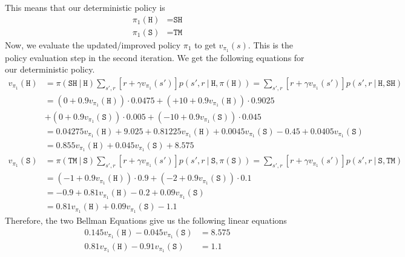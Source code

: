 \documentclass[11pt]{article}
\begin{document}
    This means that our deterministic policy is
    \begin{align*}
        \pi_{1}(\texttt{H}) &= \texttt{SH} \\
        \pi_{1}(\texttt{S}) &= \texttt{TM}
    \end{align*}
    Now, we evaluate the updated/improved policy $\pi_{1}$ to get $v_{\pi_{1}}(s)$. This is the policy evaluation step in the second
    iteration. We get the following equations for our deterministic policy.
    \begin{align*}
        v_{\pi_{1}}(\texttt{H}) &= \pi(\texttt{SH} \ | \ \texttt{H}) \sum_{s', r} \left[ r + \gamma v_{\pi_{1}}(s') \right] p(s', r \ | \ \texttt{H}, \pi(\texttt{H}))
        = \sum_{s', r} \left[ r + \gamma v_{\pi_{1}}(s') \right] p(s', r \ | \ \texttt{H}, \texttt{SH}) \\
        &= (0 + 0.9 v_{\pi_{1}}(\texttt{H})) \cdot 0.0475 + (+10 + 0.9 v_{\pi_{1}}(\texttt{H})) \cdot 0.9025 \\
        &+ (0 + 0.9 v_{\pi_{1}}(\texttt{S})) \cdot 0.005 + (-10 + 0.9 v_{\pi_{1}}(\texttt{S})) \cdot 0.045 \\
        &= 0.04275 v_{\pi_{1}}(\texttt{H}) + 9.025 + 0.81225 v_{\pi_{1}}(\texttt{H}) + 0.0045 v_{\pi_{1}}(\texttt{S}) - 0.45 + 0.0405 v_{\pi_{1}}(\texttt{S}) \\
        &= 0.855 v_{\pi_{1}}(\texttt{H}) + 0.045 v_{\pi_{1}}(\texttt{S}) + 8.575 \\
        v_{\pi_{1}}(\texttt{S}) &= \pi(\texttt{TM} \ | \ \texttt{S}) \sum_{s', r} \left[ r + \gamma v_{\pi_{1}}(s') \right] p(s', r \ | \ \texttt{S}, \pi(\texttt{S}))
        = \sum_{s', r} \left[ r + \gamma v_{\pi_{1}}(s') \right] p(s', r \ | \ \texttt{S}, \texttt{TM}) \\
        &= (-1 + 0.9 v_{\pi_{1}}(\texttt{H})) \cdot 0.9 + (-2 + 0.9 v_{\pi_{1}}(\texttt{S})) \cdot 0.1 \\
        &= -0.9 + 0.81 v_{\pi_{1}}(\texttt{H}) - 0.2 + 0.09 v_{\pi_{1}}(\texttt{S}) \\
        &= 0.81 v_{\pi_{1}}(\texttt{H}) + 0.09 v_{\pi_{1}}(\texttt{S}) - 1.1
    \end{align*}
    Therefore, the two Bellman Equations give us the following linear equations
    \begin{align*}
        0.145 v_{\pi_{1}}(\texttt{H}) - 0.045 v_{\pi_{1}}(\texttt{S}) &= 8.575 \\
        0.81 v_{\pi_{1}}(\texttt{H}) - 0.91 v_{\pi_{1}}(\texttt{S}) &= 1.1
    \end{align*}
\end{document}
